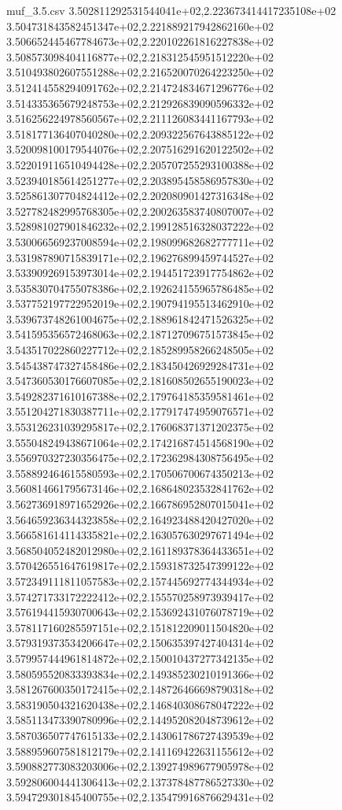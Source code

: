 \begin{filecontents*}{muf_3.5.csv}
3.502811292531544041e+02,2.223673414417235108e+02
3.504731843582451347e+02,2.221889217942862160e+02
3.506652445467784673e+02,2.220102261816227838e+02
3.508573098404116877e+02,2.218312545951512220e+02
3.510493802607551288e+02,2.216520070264223250e+02
3.512414558294091762e+02,2.214724834671296776e+02
3.514335365679248753e+02,2.212926839090596332e+02
3.516256224978560567e+02,2.211126083441167793e+02
3.518177136407040280e+02,2.209322567643885122e+02
3.520098100179544076e+02,2.207516291620122502e+02
3.522019116510494428e+02,2.205707255293100388e+02
3.523940185614251277e+02,2.203895458586957830e+02
3.525861307704824412e+02,2.202080901427316348e+02
3.527782482995768305e+02,2.200263583740807007e+02
3.528981027901846232e+02,2.199128516328037222e+02
3.530066569237008594e+02,2.198099682682777711e+02
3.531987890715839171e+02,2.196276899459744527e+02
3.533909269153973014e+02,2.194451723917754862e+02
3.535830704755078386e+02,2.192624155965786485e+02
3.537752197722952019e+02,2.190794195513462910e+02
3.539673748261004675e+02,2.188961842471526325e+02
3.541595356572468063e+02,2.187127096751573845e+02
3.543517022860227712e+02,2.185289958266248505e+02
3.545438747327458486e+02,2.183450426929284731e+02
3.547360530176607085e+02,2.181608502655190023e+02
3.549282371610167388e+02,2.179764185359581461e+02
3.551204271830387711e+02,2.177917474959076571e+02
3.553126231039295817e+02,2.176068371371202375e+02
3.555048249438671064e+02,2.174216874514568190e+02
3.556970327230356475e+02,2.172362984308756495e+02
3.558892464615580593e+02,2.170506700674350213e+02
3.560814661795673146e+02,2.168648023532841762e+02
3.562736918971652926e+02,2.166786952807015041e+02
3.564659236344323858e+02,2.164923488420427020e+02
3.566581614114335821e+02,2.163057630297671494e+02
3.568504052482012980e+02,2.161189378364433651e+02
3.570426551647619817e+02,2.159318732547399122e+02
3.572349111811057583e+02,2.157445692774344934e+02
3.574271733172222412e+02,2.155570258973939417e+02
3.576194415930700643e+02,2.153692431076078719e+02
3.578117160285597151e+02,2.151812209011504820e+02
3.579319373534206647e+02,2.150635397427404314e+02
3.579957444961814872e+02,2.150010437277342135e+02
3.580595520833393834e+02,2.149385230210191366e+02
3.581267600350172415e+02,2.148726466698790318e+02
3.583190504321620438e+02,2.146840308678047222e+02
3.585113473390780996e+02,2.144952082048739612e+02
3.587036507747615133e+02,2.143061786727439539e+02
3.588959607581812179e+02,2.141169422631155612e+02
3.590882773083203006e+02,2.139274989677905978e+02
3.592806004441306413e+02,2.137378487786527330e+02
3.594729301845400755e+02,2.135479916876629431e+02

\end{filecontents*}

